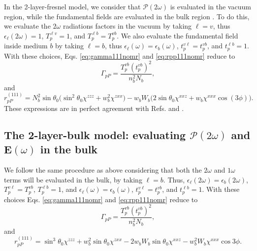 In the 2-layer-fresnel model, we consider that
$\boldsymbol{\mathcal{P}}(2\omega)$ is evaluated in the vacuum region, while the
fundamental fields are evaluated in the bulk region \cite{sipePRB87,
mizrahiJOSA88}. To do this, we evaluate the $2\omega$ radiations factors in the
vacuum by taking $\ell = v$, thus $\epsilon_{\ell}(2\omega) = 1$, $T^{\ell
v}_{p} = 1$, and $T^{\ell b}_{p} = T^{vb}_{p}$. We also evaluate the fundamental
field inside medium $b$ by taking $\ell = b$, thus $\epsilon_{\ell}(\omega) =
\epsilon_{b}(\omega)$, $t^{v\ell}_{p} = t^{vb}_{p}$, and $t^{\ell b}_{p} = 1$.
With these choices, Eqs. \eqref{eq:gamma111nomr} and \eqref{eq:rpp111nomr}
reduce to
\begin{equation}\label{eq:m78}
\Gamma_{pP}
= \frac{T^{v b}_{p}(t^{vb}_{p})^2}{n^{2}_{b}N_{b}}, 
\end{equation}
and
\begin{equation}\label{eq:m82}
r^{(111)}_{pP} =
N^{2}_{b}\sin\theta_{0}
\Big(
\sin^{2}\theta_{0}\chi^{zzz} + w^{2}_{b}\chi^{zxx}
\Big)
- w_{b}W_{b}
\Big(
2\sin\theta_{0}\chi^{xxz} + w_{b}\chi^{xxx}\cos(3\phi)
\Big).
\end{equation}
These expressions are in perfect agreement with Refs. \cite{sipePRB87} and
\cite{mizrahiJOSA88}.



\subsection{The 2-layer-bulk model: evaluating
\texorpdfstring{$\boldsymbol{\mathcal{P}}(2\omega)$}{P(2w)} and
\texorpdfstring{$\mathbf{E}(\omega)$}{E(w)} in the bulk}\label{sec:2-layer-bulk}

We follow the same procedure as above considering that both the $2\omega$ and
$1\omega$ terms will be evaluated in the bulk, by taking $\ell = b$. Thus,
$\epsilon_{\ell}(2\omega) = \epsilon_{b}(2\omega)$, $T^{v\ell}_{p} =
T^{vb}_{p}$, $T^{\ell b}_{p} = 1$, and $\epsilon_{\ell}(\omega) =
\epsilon_{b}(\omega)$, $t^{v\ell}_{p} = t^{vb}_{p}$, and $t^{\ell b}_{p} = 1$.
With these choices Eqs. \eqref{eq:gamma111nomr} and \eqref{eq:rpp111nomr} reduce
to
\begin{equation}
\Gamma_{pP} =
\frac{T_{p}^{vb}\left(t^{vb}_{p}\right)^{2}}{n^{2}_{b}N_{b}}, 
\end{equation}
and
\begin{equation}
r^{(111)}_{pP} = 
\sin^{3}\theta_{0}\chi^{zzz} + w^{2}_{b}\sin\theta_{0}\chi^{zxx} 
 - 2w_{b}W_{b}\sin\theta_{0}\chi^{xxz} - w^{2}_{b}W_{b}\chi^{xxx}\cos3\phi.
\end{equation}


